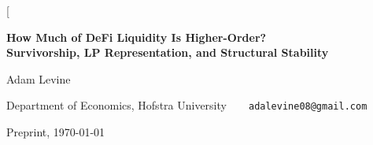 \documentclass[10pt,twocolumn]{article}
\begin{document}
\twocolumn[
\begin{@twocolumnfalse}
\vspace*{-0.5cm}
{\raggedright
{\sffamily\bfseries\LARGE How Much of DeFi Liquidity Is Higher-Order?\\[3pt]
Survivorship, LP Representation, and Structural Stability\par}
\vspace{1.2em}
{\sffamily\large Adam Levine\par}
\vspace{0.45em}
{\small Department of Economics, Hofstra University\ \ \textperiodcentered\ \
\texttt{adalevine08@gmail.com}\par}
\vspace{0.35em}
{\footnotesize Preprint, \today\par}
}


\end{@twocolumnfalse}
\end{document}
